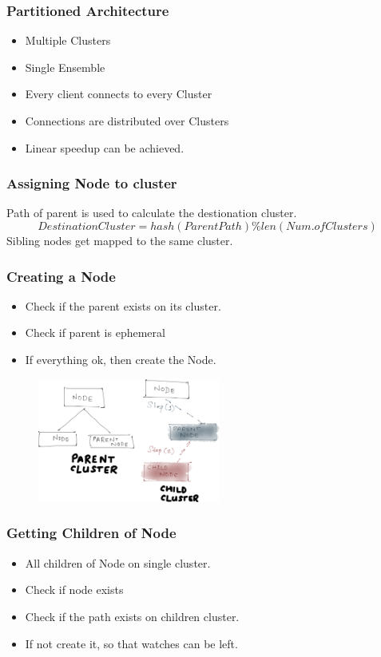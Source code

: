 \documentclass[10pt, compress]{beamer}
\begin{document}
\begin{frame}[fragile]
    \frametitle{Partitioned Architecture}
    \begin{itemize}
        \item Multiple Clusters
        \item Single Ensemble
        \item Every client connects to every Cluster
        \item Connections are distributed over Clusters
        \item Linear speedup can be achieved.
    \end{itemize}
\end{frame}

\begin{frame}[fragile]
    \frametitle{Assigning Node to cluster}
    Path of parent is used to calculate the destionation cluster.
    \begin{equation}
        Destination Cluster = hash(Parent Path) \% len(Num. of Clusters)
    \end{equation}
    Sibling nodes get mapped to the same cluster.
\end{frame}

\begin{frame}[fragile]
    \frametitle{Creating a Node}
    \begin{itemize}
        \item Check if the parent exists on its cluster.
        \item Check if parent is ephemeral
        \item If everything ok, then create the Node.
    \end{itemize}
    \begin{figure}[ht!]
        \centering
        \includegraphics[width=60mm]{images/ParKazooCreate.png}
    \end{figure}
\end{frame}

\begin{frame}[fragile]
    \frametitle{Getting Children of Node}
    \begin{itemize}
        \item All children of Node on single cluster.
        \item Check if node exists
        \item Check if the path exists on children cluster.
        \item If not create it, so that watches can be left.
    \end{itemize}
\end{frame}
\end{document}
